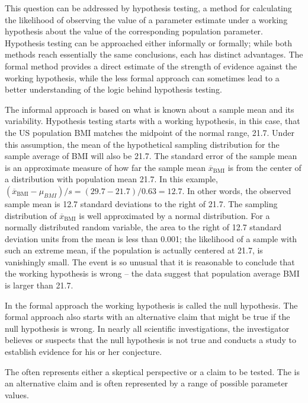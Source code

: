 \begin{spacing}{1.5}
This question can be addressed by hypothesis testing, a method for calculating the likelihood of observing the value of a parameter estimate under a working hypothesis about the value of the corresponding population parameter. Hypothesis testing can be approached either informally or formally; while both methods reach essentially  the same conclusions, each has distinct advantages. The formal method provides a direct estimate of the strength of evidence against the working hypothesis, while the less formal approach can sometimes lead to a better understanding of the logic behind hypothesis testing.

The informal approach is based on what is known about a sample mean and its variability. Hypothesis testing starts with a working hypothesis, in this case, that the US population BMI matches the midpoint of the normal range, 21.7. Under this assumption, the mean of the hypothetical sampling distribution for the sample average of BMI will also be 21.7. The standard error of the sample mean is an approximate measure of how far the sample mean $\overline{x}_{\text{BMI}}$ is from the center of a distribution with population mean 21.7. In this example, $(\overline{x}_{\text{BMI}} - \mu_{BMI})/s =  (29.7 - 21.7)/0.63 = 12.7$. In other words, the observed sample mean is 12.7 standard deviations to the right of 21.7. The sampling distribution of $\overline{x}_{\text{BMI}}$ is well approximated by a normal distribution. For a normally distributed random variable, the area to the right of 12.7 standard deviation units from the mean is less than 0.001; the likelihood of a sample with such an extreme mean, if the population is actually centered at 21.7, is vanishingly small. The event is so unusual that it is reasonable to conclude that the working hypothesis is wrong -- the data suggest that population average BMI is larger than 21.7.

In the formal approach the working hypothesis is called the null hypothesis. The formal approach also starts with an alternative claim that might be true if the null hypothesis is wrong. In nearly all scientific investigations, the investigator believes or suspects that the null hypothesis is not true and conducts a study to establish evidence for his or her conjecture.

\begin{termBox}{
{The  often represents either a skeptical perspective or a claim to be tested. The  is an alternative claim and is often represented by a range of possible parameter values.}}
\end{termBox}


\end{spacing}
